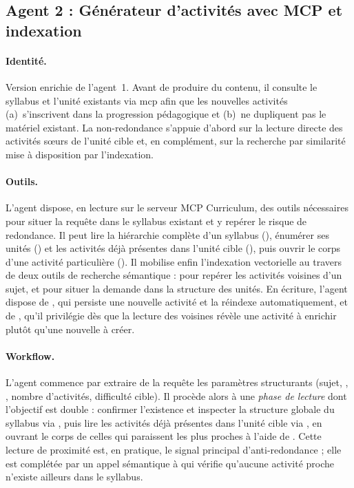 \subsection{Agent 2 : Générateur d'activités avec MCP et indexation}
\label{sec:agent2}

\paragraph{Identité.} Version enrichie de l'agent~1. Avant de produire du
contenu, il consulte le syllabus et l'unité existants via \gls{mcp} afin que
les nouvelles activités (a)~s'inscrivent dans la progression pédagogique et
(b)~ne dupliquent pas le matériel existant. La non-redondance s'appuie
d'abord sur la lecture directe des activités sœurs de l'unité cible et,
en complément, sur la recherche par similarité mise à disposition par
l'indexation.

\paragraph{Outils.} L'agent dispose, en lecture sur le serveur MCP
Curriculum, des outils nécessaires pour situer la requête dans le
syllabus existant et y repérer le risque de redondance. Il peut
lire la hiérarchie complète d'un syllabus
(), énumérer ses unités
() et les activités déjà
présentes dans l'unité cible
(), puis ouvrir le
corps d'une activité particulière ().
Il mobilise enfin l'indexation vectorielle au travers de deux outils
de recherche sémantique :
 pour repérer
les activités voisines d'un sujet, et
 pour situer la
demande dans la structure des unités. En écriture, l'agent dispose
de , qui persiste une nouvelle
activité et la réindexe automatiquement, et de
, qu'il privilégie dès que la lecture
des voisines révèle une activité à enrichir plutôt qu'une nouvelle
à créer.

\paragraph{Workflow.}
L'agent commence par extraire de la requête les paramètres
structurants (sujet, , ,
nombre d'activités, difficulté cible). Il procède alors à une
\emph{phase de lecture} dont l'objectif est double : confirmer
l'existence et inspecter la structure globale du syllabus via
, puis lire les activités déjà
présentes dans l'unité cible via
, en ouvrant le corps
de celles qui paraissent les plus proches à l'aide de
. Cette lecture de proximité est, en pratique,
le signal principal d'anti-redondance ; elle est complétée par un
appel sémantique à 
qui vérifie qu'aucune activité proche n'existe ailleurs dans le
syllabus.

